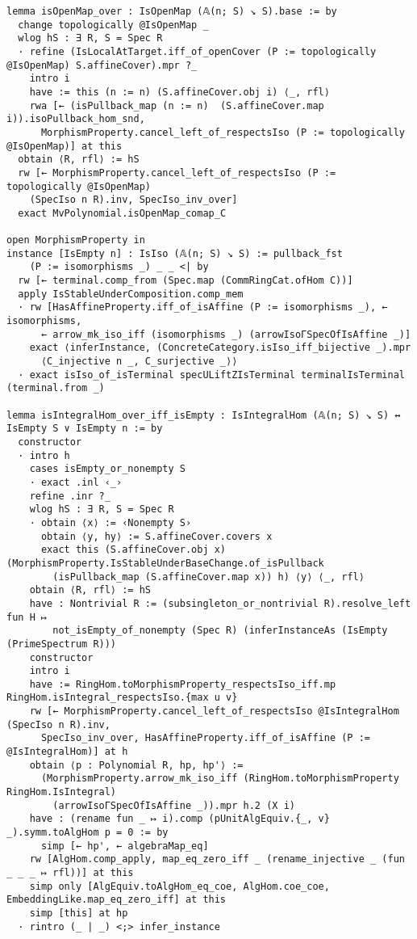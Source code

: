 \documentclass{article}
\begin{document}
\begin{lstlisting}[language=Lean, caption={AffineSpace.lean}]
lemma isOpenMap_over : IsOpenMap (𝔸(n; S) ↘ S).base := by
  change topologically @IsOpenMap _
  wlog hS : ∃ R, S = Spec R
  · refine (IsLocalAtTarget.iff_of_openCover (P := topologically @IsOpenMap) S.affineCover).mpr ?_
    intro i
    have := this (n := n) (S.affineCover.obj i) ⟨_, rfl⟩
    rwa [← (isPullback_map (n := n)  (S.affineCover.map i)).isoPullback_hom_snd,
      MorphismProperty.cancel_left_of_respectsIso (P := topologically @IsOpenMap)] at this
  obtain ⟨R, rfl⟩ := hS
  rw [← MorphismProperty.cancel_left_of_respectsIso (P := topologically @IsOpenMap)
    (SpecIso n R).inv, SpecIso_inv_over]
  exact MvPolynomial.isOpenMap_comap_C

open MorphismProperty in
instance [IsEmpty n] : IsIso (𝔸(n; S) ↘ S) := pullback_fst
    (P := isomorphisms _) _ _ <| by
  rw [← terminal.comp_from (Spec.map (CommRingCat.ofHom C))]
  apply IsStableUnderComposition.comp_mem
  · rw [HasAffineProperty.iff_of_isAffine (P := isomorphisms _), ← isomorphisms,
      ← arrow_mk_iso_iff (isomorphisms _) (arrowIsoΓSpecOfIsAffine _)]
    exact ⟨inferInstance, (ConcreteCategory.isIso_iff_bijective _).mpr
      ⟨C_injective n _, C_surjective _⟩⟩
  · exact isIso_of_isTerminal specULiftZIsTerminal terminalIsTerminal (terminal.from _)

lemma isIntegralHom_over_iff_isEmpty : IsIntegralHom (𝔸(n; S) ↘ S) ↔ IsEmpty S ∨ IsEmpty n := by
  constructor
  · intro h
    cases isEmpty_or_nonempty S
    · exact .inl ‹_›
    refine .inr ?_
    wlog hS : ∃ R, S = Spec R
    · obtain ⟨x⟩ := ‹Nonempty S›
      obtain ⟨y, hy⟩ := S.affineCover.covers x
      exact this (S.affineCover.obj x) (MorphismProperty.IsStableUnderBaseChange.of_isPullback
        (isPullback_map (S.affineCover.map x)) h) ⟨y⟩ ⟨_, rfl⟩
    obtain ⟨R, rfl⟩ := hS
    have : Nontrivial R := (subsingleton_or_nontrivial R).resolve_left fun H ↦
        not_isEmpty_of_nonempty (Spec R) (inferInstanceAs (IsEmpty (PrimeSpectrum R)))
    constructor
    intro i
    have := RingHom.toMorphismProperty_respectsIso_iff.mp RingHom.isIntegral_respectsIso.{max u v}
    rw [← MorphismProperty.cancel_left_of_respectsIso @IsIntegralHom (SpecIso n R).inv,
      SpecIso_inv_over, HasAffineProperty.iff_of_isAffine (P := @IsIntegralHom)] at h
    obtain ⟨p : Polynomial R, hp, hp'⟩ :=
      (MorphismProperty.arrow_mk_iso_iff (RingHom.toMorphismProperty RingHom.IsIntegral)
        (arrowIsoΓSpecOfIsAffine _)).mpr h.2 (X i)
    have : (rename fun _ ↦ i).comp (pUnitAlgEquiv.{_, v} _).symm.toAlgHom p = 0 := by
      simp [← hp', ← algebraMap_eq]
    rw [AlgHom.comp_apply, map_eq_zero_iff _ (rename_injective _ (fun _ _ _ ↦ rfl))] at this
    simp only [AlgEquiv.toAlgHom_eq_coe, AlgHom.coe_coe, EmbeddingLike.map_eq_zero_iff] at this
    simp [this] at hp
  · rintro (_ | _) <;> infer_instance


\end{lstlisting}
\end{document}
